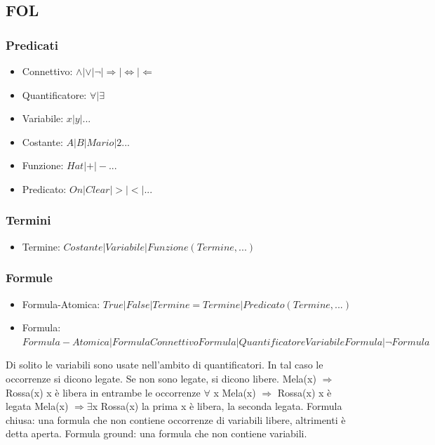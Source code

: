 \documentclass{article}
\begin{document}
\subsection{FOL}
\subsubsection{Predicati}
\begin{itemize}
    \item Connettivo: $\land | \lor | \neg | \Rightarrow | \Leftrightarrow | \Leftarrow$
    \item Quantificatore: $\forall | \exists $
    \item Variabile: $x | y | ...$
    \item Costante: $A | B | Mario | 2 ...$
    \item Funzione: $Hat | + | - ...$
    \item Predicato: $On | Clear | > | < | ...$
\end{itemize}
\subsubsection{Termini}
\begin{itemize}
    \item Termine: $Costante | Variabile | Funzione(Termine,...)$
\end{itemize}
\subsubsection{Formule}
\begin{itemize}
    \item Formula-Atomica: $True | False | Termine=Termine | Predicato(Termine,...)$
    \item Formula: $Formula-Atomica | Formula Connettivo Formula | Quantificatore Variabile Formula | \neg Formula$
\end{itemize}
Di solito le variabili sono usate nell’ambito di quantificatori. In tal caso le occorrenze si dicono legate. Se non sono legate, si dicono libere. \newline
    Mela(x) $\Rightarrow$ Rossa(x) \quad x è libera in entrambe le occorrenze \newline
	$\forall$ x Mela(x) $\Rightarrow$ Rossa(x) \quad x è legata \newline
	Mela(x) $\Rightarrow \exists$x Rossa(x) \quad la prima x è libera, la seconda legata. \newline
Formula chiusa: una formula che non contiene occorrenze di variabili libere, altrimenti è detta aperta.\newline
Formula ground: una formula che non contiene variabili.
\end{document}
